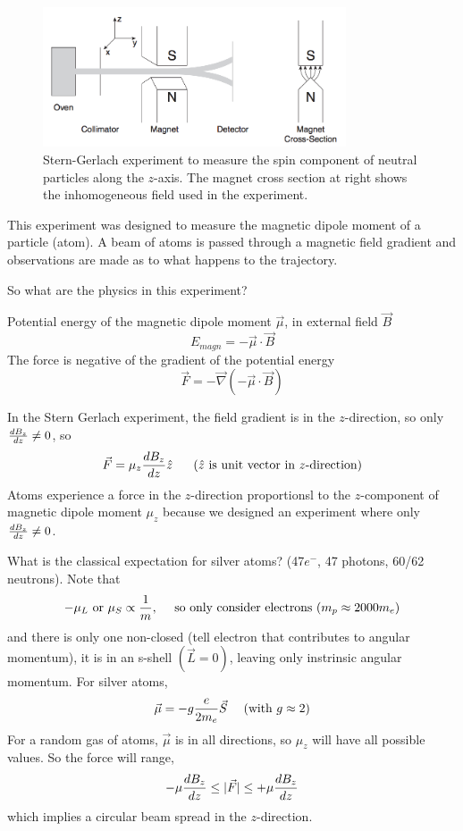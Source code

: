 \documentclass[english, 11pt]{article}
\begin{document}
       \begin{figure}[t!]
          \centering
          \includegraphics[width=0.8\textwidth]{stern_gerlach.png}
          \caption{Stern-Gerlach experiment to measure the spin component of neutral particles along the $z$-axis. The magnet cross section at right shows the inhomogeneous field used in the experiment.}
       \end{figure}

       This experiment was designed to measure the magnetic dipole moment of a particle (atom). A beam of atoms is passed through a magnetic field gradient and observations are made as to what happens to the trajectory.
       \newline

       So what are the physics in this experiment?

       Potential energy of the magnetic dipole moment $\vec{\mu}$, in external field $\vec{B}$
       \[ E_{magn} = - \vec{\mu} \cdot \vec{B} \]
       The force is negative of the gradient of the potential energy
       \[ \vec{F} = - \vec{\nabla} ( - \vec{\mu} \cdot \vec{B}) \]

       In the Stern Gerlach experiment, the field gradient is in the $z$-direction, so only $\frac{dB_z}{dz} \not = 0$, so
       \[ \vec{F} = \mu_z \f{dB_z}{dz} \hat{z} \ \ \ \ \ \mbox{($\hat{z}$ is unit vector in $z$-direction)}\]
       Atoms experience a force in the $z$-direction proportionsl to the $z$-component of magnetic dipole moment $\mu_z$ because we designed an experiment where only $\frac{dB_z}{dz} \not = 0$.
       \newline

       What is the classical expectation for silver atoms? (47$e^-$, 47 photons, 60/62 neutrons). Note that
       \[ - \mu_L \mbox{ or } \mu_S \propto \frac{1}{m}, \ \ \ \ \mbox{so only consider electrons } (m_p \approx 2000m_e) \]
       and there is only one non-closed (tell electron that contributes to angular momentum), it is in an s-shell $(\vec{L} = 0)$, leaving only instrinsic angular momentum. For silver atoms,
       \[ \vec{\mu} = - g \f{e}{2m_e} \vec{S} \ \ \ \ \mbox{(with $g \approx 2$)} \]
       For a random gas of atoms, $\vec{\mu}$ is in all directions, so $\mu_z$ will have all possible values. So the force will range,
       \[ - \mu \frac{dB_z}{dz} \leq |\vec{F}| \leq + \mu \frac{dB_z}{dz} \]
       which implies a circular beam spread in the $z$-direction.
       \newline
\end{document}
